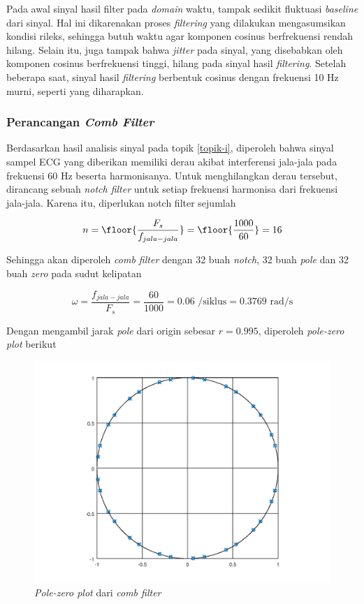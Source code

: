\documentclass[11pt]{article}
\begin{document}
Pada awal sinyal hasil filter pada \textit{domain} waktu, tampak sedikit fluktuasi \textit{baseline} dari sinyal. Hal ini dikarenakan proses \textit{filtering} yang dilakukan mengasumsikan kondisi rileks, sehingga butuh waktu agar komponen cosinus berfrekuensi rendah hilang. Selain itu, juga tampak bahwa \textit{jitter} pada sinyal, yang disebabkan oleh komponen cosinus berfrekuensi tinggi, hilang pada sinyal hasil \textit{filtering}. Setelah beberapa saat, sinyal hasil \textit{filtering} berbentuk cosinus dengan frekuensi 10 Hz murni, seperti yang diharapkan.

\subsubsection{Perancangan \textit{Comb Filter}}

Berdasarkan hasil analisis sinyal pada topik \ref{topik-i}, diperoleh bahwa sinyal sampel ECG yang diberikan memiliki derau akibat interferensi jala-jala pada frekuensi 60 Hz beserta harmonisanya. Untuk menghilangkan derau tersebut, dirancang sebuah \textit{notch filter} untuk setiap frekuensi harmonisa dari frekuensi jala-jala. Karena itu, diperlukan notch filter sejumlah

\begin{equation}
    n = \floor{\frac{F_s}{f_{jala-jala}}} = \floor{\frac{1000}{60}} = 16
\end{equation}

Sehingga akan diperoleh \textit{comb filter} dengan 32 buah \textit{notch}, 32 buah \textit{pole} dan 32 buah \textit{zero} pada sudut kelipatan

\begin{equation}
    \omega = \frac{f_{jala-jala}}{F_s} = \frac{60}{1000} = 0.06 \text{ /siklus} = 0.3769 \text{ rad/s}
\end{equation}

Dengan mengambil jarak \textit{pole} dari origin sebesar $r = 0.995$, diperoleh \textit{pole-zero plot} berikut

\begin{figure}[H]
\centerline{\includegraphics[scale=0.5]{figures/fig17-combpzp.png}}
\caption{\textit{Pole-zero plot} dari \textit{comb filter}}
\label{bpffreqresp}
\end{figure}
\end{document}
